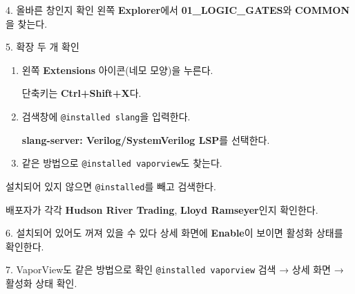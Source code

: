 \begin{frame}{4. 올바른 창인지 확인}
\small 왼쪽 \textbf{Explorer}에서 \textbf{01\_LOGIC\_GATES}와 \textbf{COMMON}을 찾는다.
\end{frame}

\begin{frame}[label=vsc01-extensions]{5. 확장 두 개 확인}
\small
\begin{enumerate}
\setlength{\itemsep}{0.22cm}
\item 왼쪽 \textbf{Extensions} 아이콘(네모 모양)을 누른다.\par
단축키는 \textbf{Ctrl+Shift+X}다.
\item 검색창에 \texttt{@installed slang}을 입력한다.\par
\textbf{slang-server: Verilog/SystemVerilog LSP}를 선택한다.
\item 같은 방법으로 \texttt{@installed vaporview}도 찾는다.
\end{enumerate}
\vspace{0.25cm}
설치되어 있지 않으면 \texttt{@installed}를 빼고 검색한다.\par
배포자가 각각 \textbf{Hudson River Trading}, \textbf{Lloyd Ramseyer}인지 확인한다.
\end{frame}

\begin{frame}{6. 설치되어 있어도 꺼져 있을 수 있다}
\small 상세 화면에 \textbf{Enable}이 보이면 활성화 상태를 확인한다.
\end{frame}

\begin{frame}{7. VaporView도 같은 방법으로 확인}
\small \texttt{@installed vaporview} 검색 → 상세 화면 → 활성화 상태 확인.
\end{frame}


